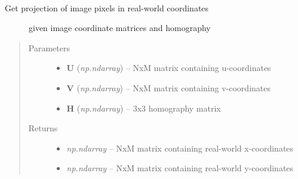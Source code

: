 \documentclass[letterpaper,10pt,english]{sphinxmanual}
\begin{document}
\begin{fulllineitems}
\label{flamingo/rectification/index:flamingo.rectification.rectification.rectify_coordinates}~\begin{description}
\item[{Get projection of image pixels in real-world coordinates}] \leavevmode
given image coordinate matrices and  homography

\end{description}
\begin{quote}\begin{description}
\item[{Parameters}] \leavevmode\begin{itemize}
\item {} 
\textbf{U} (\emph{np.ndarray}) -- NxM matrix containing u-coordinates

\item {} 
\textbf{V} (\emph{np.ndarray}) -- NxM matrix containing v-coordinates

\item {} 
\textbf{H} (\emph{np.ndarray}) -- 3x3 homography matrix

\end{itemize}

\item[{Returns}] \leavevmode
\begin{itemize}
\item {} 
\emph{np.ndarray} --
NxM matrix containing real-world x-coordinates

\item {} 
\emph{np.ndarray} --
NxM matrix containing real-world y-coordinates

\end{itemize}


\end{description}\end{quote}

\end{fulllineitems}

\end{document}
